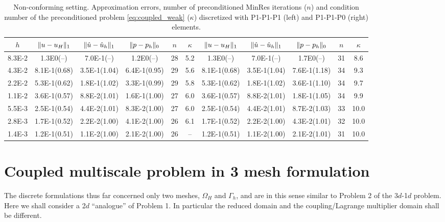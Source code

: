 \documentclass[r]{siamart171218}
\begin{document}
\begin{table}
  \begin{center}
    \scriptsize{
  \begin{tabular}{c|ccc|c|c||ccc|c|c}
    \hline
    $h$ & $\lVert{u-u_H}\rVert_1$ & $\lVert{\hat{u}-\hat{u}_h}\rVert_1$ & $\lVert{p-p_h}\rVert_0$ & $n$ & $\kappa$
        & $\lVert{u-u_H}\rVert_1$ & $\lVert{\hat{u}-\hat{u}_h}\rVert_1$ & $\lVert{p-p_h}\rVert_0$ & $n$ & $\kappa$ \\
    \hline
8.3E-2 & 1.3E0(--)    & 7.0E-1(--)   & 1.2E0(--)    & 28 & 5.2 & 1.3E0(--)    & 7.0E-1(--)   & 1.7E0(--)     & 31 & 8.6\\   
4.3E-2 & 8.1E-1(0.68) & 3.5E-1(1.04) & 6.4E-1(0.95) & 29 & 5.6 & 8.1E-1(0.68) & 3.5E-1(1.04) & 7.6E-1(1.18)  & 34 & 9.3\\ 
2.2E-2 & 5.3E-1(0.62) & 1.8E-1(1.02) & 3.3E-1(0.99) & 29 & 5.8 & 5.3E-1(0.62) & 1.8E-1(1.02) & 3.6E-1(1.10)  & 34 & 9.7\\ 
1.1E-2 & 3.6E-1(0.57) & 8.8E-2(1.01) & 1.6E-1(1.00) & 27 & 6.0 & 3.6E-1(0.57) & 8.8E-2(1.01) & 1.8E-1(1.05)  & 34 & 9.9\\ 
5.5E-3 & 2.5E-1(0.54) & 4.4E-2(1.01) & 8.3E-2(1.00) & 27 & 6.0 & 2.5E-1(0.54) & 4.4E-2(1.01) & 8.7E-2(1.03)  & 33 & 10.0\\
2.8E-3 & 1.7E-1(0.52) & 2.2E-2(1.00) & 4.1E-2(1.00) & 26 & 6.1 & 1.7E-1(0.52) & 2.2E-2(1.00) & 4.3E-2(1.01)  & 32 & 10.0\\
1.4E-3 & 1.2E-1(0.51) & 1.1E-2(1.00) & 2.1E-2(1.00) & 26 & --  & 1.2E-1(0.51) & 1.1E-2(1.00) & 2.1E-2(1.01)  & 31 & 10.0\\
    \hline
  \end{tabular}
    }
    \caption{Non-conforming setting. Approximation errors, number of preconditioned MinRes iterations ($n$) and
      condition number of the preconditioned problem \eqref{eq:coupled_weak} ($\kappa$) discretized
      with P1-P1-P1 (left) and P1-P1-P0 (right) elements.}
  \label{tab:coupled_non}
  \end{center}
\end{table}


\section{Coupled multiscale problem in 3 mesh formulation}\label{sec:coupled_3}
The discrete formulations thus far concerned only two meshes, $\Omega_H$ and $\Gamma_h$,
and are in this sense similar to Problem 2 of the 3$d$-1$d$ problem. Here we
shall consider a 2$d$ ``analogue'' of Problem 1. In particular the reduced
domain and the coupling/Lagrange multiplier domain shall be different.
\end{document}
